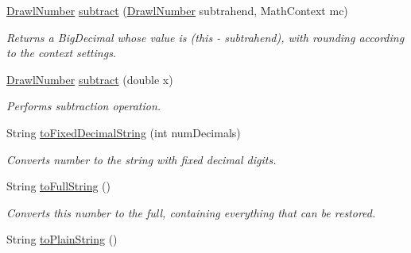 \begin{DoxyCompactItemize}
\hyperlink{classcom_1_1aarrelaakso_1_1drawl_1_1_drawl_number}{Drawl\+Number} \hyperlink{classcom_1_1aarrelaakso_1_1drawl_1_1_drawl_number_a178417df4cbe7a65403cb33a1c0da1e3}{subtract} (\hyperlink{classcom_1_1aarrelaakso_1_1drawl_1_1_drawl_number}{Drawl\+Number} subtrahend, Math\+Context mc)
\begin{DoxyCompactList}\small\item\em Returns a Big\+Decimal whose value is (this -\/ subtrahend), with rounding according to the context settings. \end{DoxyCompactList}\item 
\hyperlink{classcom_1_1aarrelaakso_1_1drawl_1_1_drawl_number}{Drawl\+Number} \hyperlink{classcom_1_1aarrelaakso_1_1drawl_1_1_drawl_number_af26b18ee4dbadbad9cece6dc5e9a02ba}{subtract} (double x)
\begin{DoxyCompactList}\small\item\em Performs subtraction operation. \end{DoxyCompactList}\item 
String \hyperlink{classcom_1_1aarrelaakso_1_1drawl_1_1_drawl_number_abb3852d8cebda506fbcb18f9705522ff}{to\+Fixed\+Decimal\+String} (int num\+Decimals)
\begin{DoxyCompactList}\small\item\em Converts number to the string with fixed decimal digits. \end{DoxyCompactList}\item 
String \hyperlink{classcom_1_1aarrelaakso_1_1drawl_1_1_drawl_number_afa8d185aa5f961e7d54e62c96d788660}{to\+Full\+String} ()
\begin{DoxyCompactList}\small\item\em Converts this number to the full, containing everything that can be restored. \end{DoxyCompactList}\item 
String \hyperlink{classcom_1_1aarrelaakso_1_1drawl_1_1_drawl_number_a07c4c1c3a0e81ae9aef3325bef3e0152}{to\+Plain\+String} ()
\end{DoxyCompactItemize}
